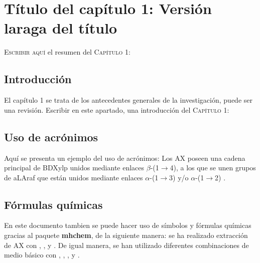 \chapter{Título del capítulo 1: Versión laraga del título}


\begin{ResumenPhDThesis}
\begin{changemargin}{1cm}{1cm}
\lettrine[lines=3]{E}{scribir aquí} el resumen del \textsc{Capítulo 1}: \lipsum[3]
\end{changemargin}
\end{ResumenPhDThesis}


\section{Introducción}
El capítulo 1 se trata de los antecedentes generales de la investigación, puede ser una revisión. Escribir en este apartado, una introducción del \textsc{Capítulo 1}: \lipsum[3]


\section{Uso de acrónimos}
Aquí se presenta un ejemplo del uso de acrónimos: Los \acf{AX} poseen una cadena principal de \acf{BDXylp} unidos mediante enlaces $\beta$-(1$\rightarrow$4), a los que se unen grupos de  \acf{aLAraf} que están unidos mediante enlaces $\alpha$-(1$\rightarrow$3) y/o $\alpha$-(1$\rightarrow$2) \citep{perez2019physicochemical}. 

\lipsum[2]


\section{Fórmulas químicas}
En este documento tambien se puede hacer uso de símbolos y fórmulas químicas gracias al paquete \textbf{mhchem}, de la siguiente manera: se ha realizado extracción de AX con , ,  y . De igual manera, se han utilizado diferentes combinaciones de medio básico con , , ,  y .

